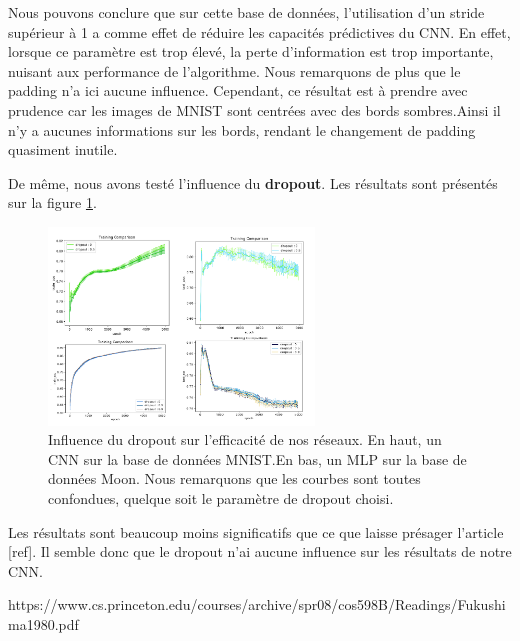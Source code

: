 Nous pouvons conclure que sur cette base de données, l'utilisation d'un stride supérieur à 1 a comme effet de réduire les capacités prédictives du CNN. En effet, lorsque ce paramètre est trop élevé, la perte d'information est trop importante, nuisant aux performance de l'algorithme. Nous remarquons de plus que le padding n'a ici aucune influence. Cependant, ce résultat est à prendre avec prudence car les images de MNIST sont centrées avec des bords sombres.Ainsi il n'y a aucunes informations sur les bords, rendant le changement de padding quasiment inutile. 

De même, nous avons testé l'influence du \textbf{dropout}. Les résultats sont présentés sur la figure \ref{resultat_dropout}.
  
\begin{figure}[!h]
\centering
\includegraphics[width=200pt]{images/cnn/resultat_dropout.png}
\caption{Influence du dropout sur l'efficacité de nos réseaux. En haut, un CNN sur la base de données MNIST.En bas, un MLP sur la base de données Moon. Nous remarquons que les courbes sont toutes confondues, quelque soit le paramètre de dropout choisi.}
\label{resultat_dropout}
\end{figure}

Les résultats sont beaucoup moins significatifs que ce que laisse présager l'article [ref]. Il semble donc que le dropout n'ai aucune influence sur les résultats de notre CNN. 

https://www.cs.princeton.edu/courses/archive/spr08/cos598B/Readings/Fukushima1980.pdf


